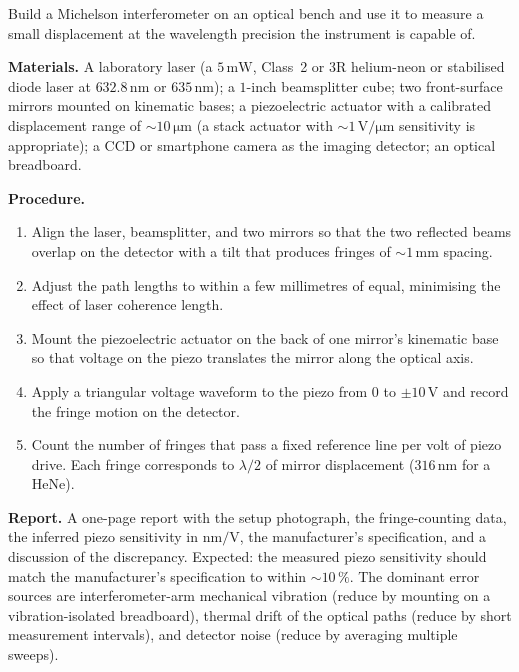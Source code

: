 \begin{project}
Build a Michelson interferometer on an optical bench and use it to
measure a small displacement at the wavelength precision the
instrument is capable of.

\textbf{Materials.}
A laboratory laser (a $5\,\si{\milli\watt}$, Class~2 or 3R helium-neon
or stabilised diode laser at $632.8\,\si{\nano\meter}$ or
$635\,\si{\nano\meter}$); a $1$-inch beamsplitter cube; two
front-surface mirrors mounted on kinematic bases; a piezoelectric
actuator with a calibrated displacement range of $\sim 10\,\si{
\micro\meter}$ (a stack actuator with $\sim 1\,\si{\volt\per\micro
\meter}$ sensitivity is appropriate); a CCD or smartphone camera as
the imaging detector; an optical breadboard.

\textbf{Procedure.}
\begin{enumerate}
  \item Align the laser, beamsplitter, and two mirrors so that the
    two reflected beams overlap on the detector with a tilt that
    produces fringes of $\sim 1\,\si{\milli\meter}$ spacing.
  \item Adjust the path lengths to within a few millimetres of equal,
    minimising the effect of laser coherence length.
  \item Mount the piezoelectric actuator on the back of one mirror's
    kinematic base so that voltage on the piezo translates the
    mirror along the optical axis.
  \item Apply a triangular voltage waveform to the piezo from $0$ to
    $\pm 10\,\si{\volt}$ and record the fringe motion on the
    detector.
  \item Count the number of fringes that pass a fixed reference line
    per volt of piezo drive. Each fringe corresponds to $\lambda/2$
    of mirror displacement ($316\,\si{\nano\meter}$ for a HeNe).
\end{enumerate}

\textbf{Report.} A one-page report with the setup photograph, the
fringe-counting data, the inferred piezo sensitivity in $\si{\nano
\meter\per\volt}$, the manufacturer's specification, and a discussion
of the discrepancy. Expected: the measured piezo sensitivity should
match the manufacturer's specification to within $\sim 10\,\%$. The
dominant error sources are interferometer-arm mechanical vibration
(reduce by mounting on a vibration-isolated breadboard), thermal
drift of the optical paths (reduce by short measurement intervals),
and detector noise (reduce by averaging multiple sweeps).
\end{project}

